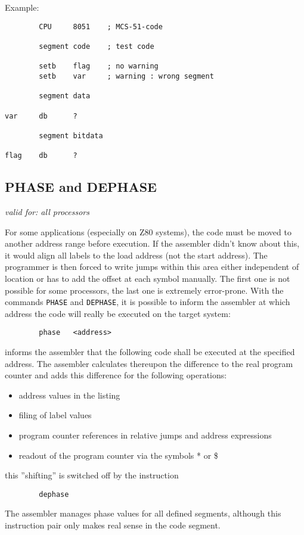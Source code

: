 \documentclass[12pt,twoside]{report}
\makeatletter
\newcommand{\tty}[1]{{\tt #1}}
\newcommand{\ttindex}[1]{\index{#1@{\tt #1}}}
\makeatother
\begin{document}
Example:
\begin{verbatim}
        CPU     8051    ; MCS-51-code

        segment code    ; test code

        setb    flag    ; no warning
        setb    var     ; warning : wrong segment

        segment data

var     db      ?

        segment bitdata

flag    db      ?
\end{verbatim}


\subsection{PHASE and DEPHASE}
\ttindex{PHASE}\ttindex{DEPHASE}

{\em valid for: all processors}

For some applications (especially on Z80 systems), the code must be moved
to another address range before execution.  If the assembler didn't know
about this, it would align all labels to the load address (not the start
address).  The programmer is then forced to write jumps within this area
either independent of location or has to add the offset at each symbol
manually.  The first one is not possible for some processors, the last one
is extremely error-prone.  With the commands \tty{PHASE} and
\tty{DEPHASE}, it is possible to inform the assembler at which address the
code will really be executed on the target system:
\begin{verbatim}
        phase   <address>
\end{verbatim}
informs the assembler that the following code shall be executed at the 
specified address.  The assembler calculates thereupon the difference to 
the real program counter and adds this difference for the following 
operations:
\begin{itemize}
\item{address values in the listing}
\item{filing of label values}
\item{program counter references in relative jumps and address expressions}
\item{readout of the program counter via the symbols * or \$}
\end{itemize}
this ''shifting'' is switched off by the instruction
\begin{verbatim}
        dephase
\end{verbatim}
The assembler manages phase values for all defined segments, although 
this instruction pair only makes real sense in the code segment.  
\end{document}
